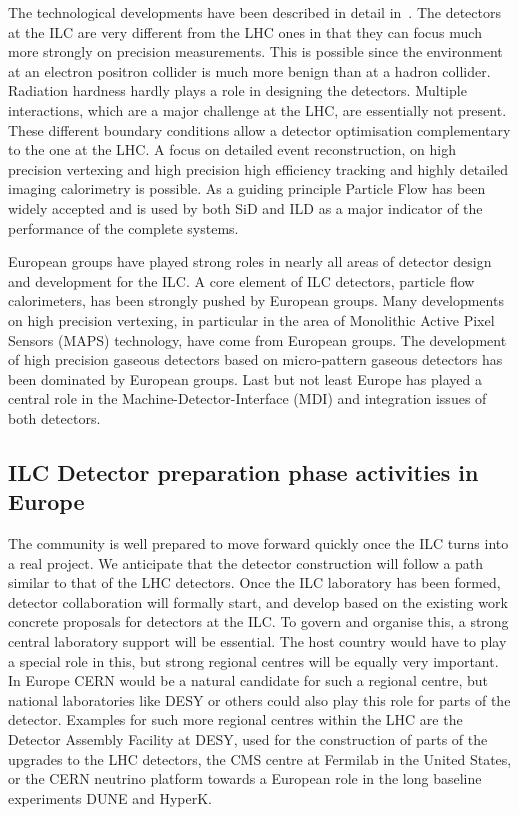 \documentclass[%
 reprint,
 floatfix,
 amsmath,amssymb,
 aps,
]{revtex4-1}
\begin{document}
The technological developments have been described in detail in~\cite{ILCESU1}. 
The detectors at the ILC are very different from the LHC ones in that they 
can focus much more strongly on precision measurements. This is possible since 
the environment at an electron positron collider is much more benign than at a 
hadron collider. Radiation hardness hardly plays a role in designing the 
detectors. Multiple interactions, which are a major challenge at the LHC, are 
essentially not present. These different boundary conditions allow a detector 
optimisation complementary to the one at the LHC. A focus on detailed event 
reconstruction, on high precision vertexing and high precision high efficiency 
tracking and highly detailed imaging calorimetry is possible. As a guiding 
principle Particle Flow has been widely accepted and is used by both SiD and ILD 
as a major indicator of the performance of the complete systems. 

European groups have played strong roles in nearly all areas of detector design 
and development for the ILC. A core element of ILC detectors, particle flow 
calorimeters, has been strongly pushed by European groups. Many developments on 
high precision vertexing, in particular in the area of Monolithic Active Pixel 
Sensors (MAPS) technology, have come from European groups. The development of 
high precision gaseous detectors based on micro-pattern gaseous detectors has 
been dominated by European groups. Last but not least Europe has played a 
central role in the Machine-Detector-Interface (MDI) and integration issues of 
both detectors.

\subsection{ILC Detector preparation phase activities in Europe~\label{sec:det:prepphase}}
The community is well prepared to move forward quickly once the ILC turns into a 
real project. We anticipate that the detector construction will follow a path 
similar to that of the LHC detectors. Once the ILC laboratory has been formed, 
detector collaboration will formally start, and develop based on the existing 
work concrete proposals for detectors at the ILC. To govern and organise this, a 
strong central laboratory support will be essential. The host country would have 
to play a special role in this, but strong regional centres will be equally very 
important. In Europe CERN would be a natural candidate for such a regional 
centre, but national laboratories like DESY or others could also play this role 
for parts of the detector. Examples for such more regional centres within the 
LHC are the Detector Assembly Facility at DESY, used for the construction of 
parts of the upgrades to the LHC detectors, the CMS centre at Fermilab in the 
United States, or the CERN neutrino platform towards a European role in the long 
baseline experiments DUNE and HyperK. 
\end{document}
